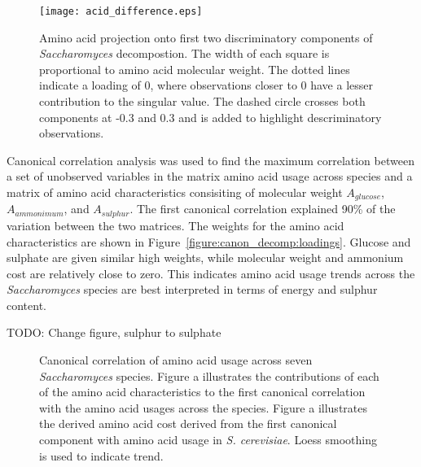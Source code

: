 \begin{figure}
  \centering
  \texttt{[image: acid\_difference.eps]}
  \caption[Amino acid projection onto first two discriminatory components of \emph{Saccharomyces} decompostion]{Amino acid projection onto first two discriminatory components of \emph{Saccharomyces} decompostion. The width of each square is proportional to amino acid molecular weight. The dotted lines indicate a loading of 0, where observations closer to 0 have a lesser contribution to the singular value. The dashed circle crosses both components at -0.3 and 0.3 and is added to highlight descriminatory observations.}
  \label{figure:acid_decomp}
\end{figure}

Canonical correlation analysis was used to find the maximum correlation between a set of unobserved variables in the matrix amino acid usage across species and a matrix of amino acid characteristics consisiting of molecular weight $A_{glucose}$, $A_{ammonimum}$, and $A_{sulphur}$. The first canonical correlation explained 90\% of the variation between the two matrices. The weights for the amino acid characteristics are shown in Figure~\vref{figure:canon_decomp:loadings}. Glucose and sulphate are given similar high weights, while molecular weight and ammonium cost are relatively close to zero. This indicates amino acid usage trends across the \emph{Saccharomyces} species are best interpreted in terms of energy and sulphur content.

TODO: Change figure, sulphur to sulphate

\begin{figure}
  \centering
  \vfill
  \caption[Canonical correlation of amino acid usage]{Canonical correlation of amino acid usage across seven \emph{Saccharomyces} species. Figure a illustrates the contributions of each of the amino acid characteristics to the first canonical correlation with the amino acid usages across the species. Figure a illustrates the derived amino acid cost derived from the first canonical component with amino acid usage in \emph{S. cerevisiae}. Loess smoothing is used to indicate trend.}
  \label{figure:canon_decomp}
\end{figure}

